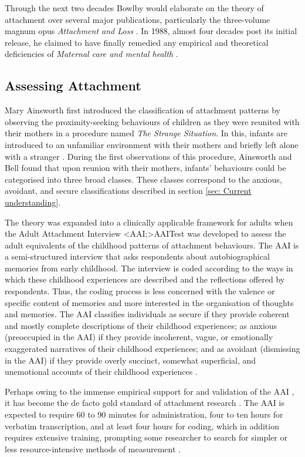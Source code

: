\documentclass[12pt]{report}
\begin{document}
Through the next two decades Bowlby would elaborate on the theory of attachment over several major publications, particularly the three-volume magnum opus \textit{Attachment and Loss} \cite{Bowlby1969attachment, Bowlby1973separation,Bowlby1980loss}.
In 1988, almost four decades post its initial release, he claimed to have finally remedied any empirical and theoretical deficiencies of \textit{Maternal care and mental health} \cite{Bowlby1988}.

\subsection{Assessing Attachment}
Mary Ainsworth first introduced the classification of attachment patterns by observing the proximity-seeking behaviours of children as they were reunited with their mothers in a procedure named \textit{The Strange Situation}.
In this, infants are introduced to an unfamiliar environment with their mothers and briefly left alone with a stranger .
During the first observations of this procedure, Ainsworth and Bell \citeyear{Ainsworth1970} found that upon reunion with their mothers, infants' behaviours could be categorised into three broad classes.
These classes correspond to the anxious, avoidant, and secure classifications described in section \ref{sec: Current understanding}.

The theory was expanded into a clinically applicable framework for adults when the Adult Attachment Interview \shortcite<AAI;>{AAITest} was developed to assess the adult equivalents of the childhood patterns of attachment behaviours.
The AAI is a semi-structured interview that asks respondents about autobiographical memories from early childhood.
The interview is coded according to the ways in which these childhood experiences are described and the reflections offered by respondents.
Thus, the coding process is less concerned with the valence or specific content of memories and more interested in the organisation of thoughts and memories.
The AAI classifies individuals as secure if they provide coherent and mostly complete descriptions of their childhood experiences;
as anxious (preoccupied in the AAI) if they provide incoherent, vague, or emotionally exaggerated narratives of their childhood experiences;
and as avoidant (dismissing in the AAI) if they provide overly succinct, somewhat superficial, and unemotional accounts of their childhood experiences \cite{Hesse1999, AAITest}.

Perhaps owing to the immense empirical support for and validation of the AAI \cite{BakermansKranenburg1993, IJzendoorn1995, Crowell1996Discriminant, Sagi1994}, it has become the de facto gold standard of attachment research .
The AAI is expected to require 60 to 90 minutes for administration, four to ten hours for verbatim transcription, and at least four hours for coding, which in addition requires extensive training, prompting some researcher to search for simpler or less resource-intensive methods of measurement .
\end{document}
